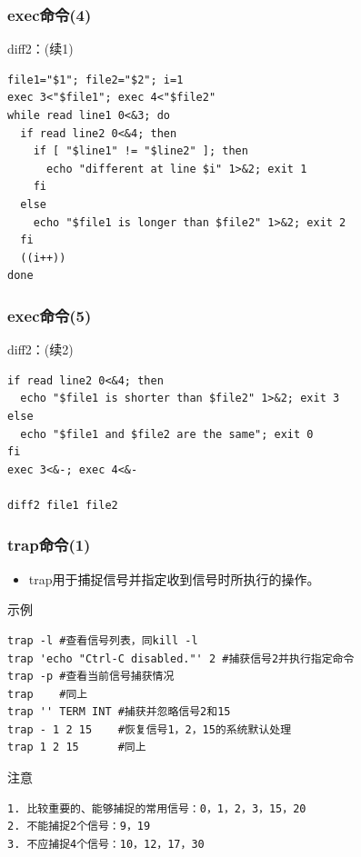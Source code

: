 \documentclass[xcolor=svgnames,presentation]{beamer}
\begin{document}
\begin{frame}[fragile]
\frametitle{exec命令(4)}
\label{sec-1-3-6}
\begin{exampleblock}{diff2：(续1)}
\label{sec-1-3-6-1}


\begin{verbatim}
file1="$1"; file2="$2"; i=1
exec 3<"$file1"; exec 4<"$file2"
while read line1 0<&3; do
  if read line2 0<&4; then
    if [ "$line1" != "$line2" ]; then
      echo "different at line $i" 1>&2; exit 1
    fi
  else
    echo "$file1 is longer than $file2" 1>&2; exit 2
  fi
  ((i++))
done
\end{verbatim}
\end{exampleblock}
\end{frame}
\begin{frame}[fragile]
\frametitle{exec命令(5)}
\label{sec-1-3-7}
\begin{exampleblock}{diff2：(续2)}
\label{sec-1-3-7-1}


\begin{verbatim}
if read line2 0<&4; then
  echo "$file1 is shorter than $file2" 1>&2; exit 3
else
  echo "$file1 and $file2 are the same"; exit 0
fi
exec 3<&-; exec 4<&-

diff2 file1 file2
\end{verbatim}
\end{exampleblock}
\end{frame}
\begin{frame}[fragile]
\frametitle{trap命令(1)}
\label{sec-1-3-8}
\begin{itemize}

\item trap用于捕捉信号并指定收到信号时所执行的操作。
\label{sec-1-3-8-1}%
\end{itemize} %
\begin{exampleblock}{示例}
\label{sec-1-3-8-2}


\begin{verbatim}
trap -l #查看信号列表，同kill -l
trap 'echo "Ctrl-C disabled."' 2 #捕获信号2并执行指定命令
trap -p #查看当前信号捕获情况
trap    #同上
trap '' TERM INT #捕获并忽略信号2和15
trap - 1 2 15    #恢复信号1，2，15的系统默认处理
trap 1 2 15      #同上
\end{verbatim}
\end{exampleblock}
\begin{block}{注意}
\label{sec-1-3-8-3}


\begin{verbatim}
1. 比较重要的、能够捕捉的常用信号：0，1，2，3，15，20
2. 不能捕捉2个信号：9，19
3. 不应捕捉4个信号：10，12，17，30
\end{verbatim}
\end{block}
\end{frame}
\end{document}
